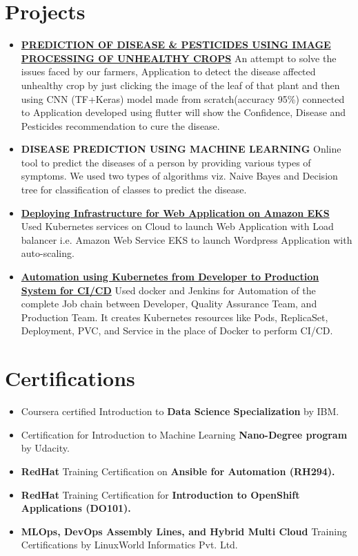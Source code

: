 \documentclass[letterpaper,11pt]{article}
\newcommand{\resumeItem}[2]{
  \item\small{
    \textbf{#1}{ #2 \vspace{-2pt}}
  }
}
\newcommand{\resumeSubItem}[2]{\resumeItem{#1}{#2}\vspace{-4pt}}
\newcommand{\resumeSubHeadingListStart}{\begin{itemize}[leftmargin=*]}
\newcommand{\resumeSubHeadingListEnd}{\end{itemize}}
\begin{document}
\section{Projects}
  \resumeSubHeadingListStart
    \resumeSubItem{\href{https://www.linkedin.com/posts/rohit-ghumare_learning-developer-googlecloudplatform-activity-6723227641203212288-Ggxq}{PREDICTION OF DISEASE \& PESTICIDES USING IMAGE PROCESSING OF UNHEALTHY CROPS}}
      {An attempt to solve the issues faced by our farmers, Application to detect the disease affected unhealthy crop by just clicking the image of the leaf of that plant and then using CNN (TF+Keras) model made from scratch(accuracy 95\%) connected to Application developed using flutter will show the Confidence, Disease and Pesticides recommendation to cure the disease.}
    \resumeSubItem{DISEASE PREDICTION USING MACHINE LEARNING}
      {Online tool to predict the diseases of a person by providing various types of symptoms. We used two types of algorithms viz. Naive Bayes and Decision tree for classification of classes to predict the disease.}
    \resumeSubItem{\href{https://ghumare64.medium.com/deploying-infrastructure-frontend-backend-on-aws-using-amazon-eks-5f1f426d618e}{Deploying Infrastructure for Web Application on Amazon EKS}}
      {Used Kubernetes services on Cloud to launch Web Application with Load balancer i.e. Amazon Web Service EKS to launch Wordpress Application with auto-scaling.}
    \resumeSubItem{\href{https://ghumare64.medium.com/automation-using-kubernetes-from-developer-to-production-system-for-ci-cd-b766ea783e}{Automation using Kubernetes from Developer to Production System for CI/CD}}
      {Used docker and Jenkins for Automation of the complete Job chain between Developer, Quality Assurance Team, and Production Team. It creates Kubernetes resources like Pods, ReplicaSet, Deployment, PVC, and Service in the place of Docker to perform CI/CD.}
  \resumeSubHeadingListEnd

\section{Certifications}
 \resumeSubHeadingListStart
  \resumeSubItem{}{Coursera certified Introduction to
  \textbf{Data Science Specialization} by IBM.}
  \resumeSubItem{}{Certification for Introduction to Machine Learning
  \textbf{Nano-Degree program} by Udacity.}
  \resumeSubItem{}{\textbf{RedHat} Training Certification on
  \textbf{Ansible for Automation (RH294).}}
  \resumeSubItem{}{\textbf{RedHat} Training Certification for
  \textbf{Introduction to OpenShift Applications (DO101).}}
  \resumeSubItem{}{\textbf{MLOps,  DevOps Assembly Lines, and Hybrid Multi Cloud} Training Certifications by LinuxWorld Informatics Pvt. Ltd.}
 \resumeSubHeadingListEnd
\end{document}
